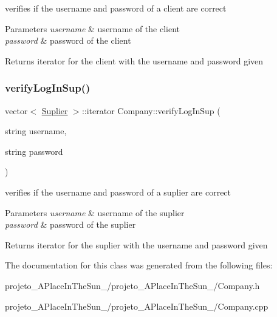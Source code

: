 verifies if the username and password of a client are correct 


\begin{DoxyParams}{Parameters}
{\em username} & username of the client\\
\hline
{\em password} & password of the client\\
\hline
\end{DoxyParams}
\begin{DoxyReturn}{Returns}
iterator for the client with the username and password given 
\end{DoxyReturn}
\hypertarget{class_company_a9012e0fa84141868a482a0a69b6313af}{}\label{class_company_a9012e0fa84141868a482a0a69b6313af} 
\subsubsection{\texorpdfstring{verify\+Log\+In\+Sup()}{verifyLogInSup()}}
{\footnotesize\ttfamily vector$<$ \hyperlink{class_suplier}{Suplier} $>$\+::iterator Company\+::verify\+Log\+In\+Sup (\begin{DoxyParamCaption}\item[{string}]{username,  }\item[{string}]{password }\end{DoxyParamCaption})}



verifies if the username and password of a suplier are correct 


\begin{DoxyParams}{Parameters}
{\em username} & username of the suplier\\
\hline
{\em password} & password of the suplier\\
\hline
\end{DoxyParams}
\begin{DoxyReturn}{Returns}
iterator for the suplier with the username and password given 
\end{DoxyReturn}


The documentation for this class was generated from the following files\+:\begin{DoxyCompactItemize}
\item 
projeto\+\_\+\+A\+Place\+In\+The\+Sun\+\_/projeto\+\_\+\+A\+Place\+In\+The\+Sun\+\_/Company.\+h\item 
projeto\+\_\+\+A\+Place\+In\+The\+Sun\+\_/projeto\+\_\+\+A\+Place\+In\+The\+Sun\+\_/Company.\+cpp\end{DoxyCompactItemize}
